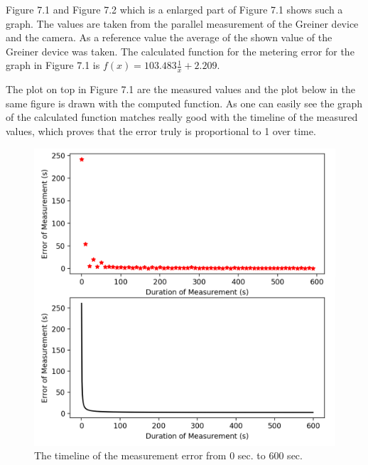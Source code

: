 \documentclass[12pt, a4paper]{report}
\begin{document}
Figure 7.1 and Figure 7.2 which is a enlarged part of Figure 7.1 shows such a graph. The values are taken from the parallel measurement of the Greiner device and the camera. As a reference value the average of the shown value of the Greiner device was taken. The calculated function for the metering error for the graph in Figure 7.1 is \( f(x) = 103.483 \frac{1}{x} + 2.209 \). 


The plot on top in Figure 7.1 are the measured values and the plot below in the same figure is drawn with the computed function. As one can easily see the graph of the calculated function matches really good with the timeline of the measured values, which proves that the error truly is proportional to 1 over time. 

      \begin{figure}[H]
        \centering
        \includegraphics[scale=0.6]{Images/error_measurement}
        
        \caption{The timeline of the measurement error from 0 sec. to 600 sec.}
        \end{figure}
\end{document}

